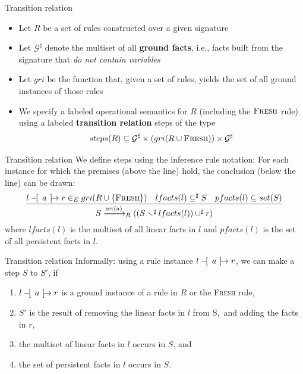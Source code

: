 \documentclass[11pt,aspectratio=169]{beamer}
\begin{document}
\begin{frame}[fragile]{Transition relation}
    \begin{itemize}
        \item Let $R$ be a set of rules constructed over a given signature
        \item Let $\mathcal{G}^{\sharp}$ denote the multiset of all
              \textbf{ground facts}, i.e., facts built from the signature that 
              \textit{do not contain variables}
        \item Let $gri$ be the function that, given a set of rules, yields the 
              set of all ground instances of those rules
        \item We specify a labeled operational semantics for $R$ (including the 
              $\textsc{Fresh}$ rule) using a labeled
              \textbf{transition relation} steps of the type
        \begin{equation*}
            steps(R) \subseteq \mathcal{G}^{\sharp} \times (gri(R \cup {\textsc
            {Fresh}})) \times \mathcal{G}^{\sharp}
        \end{equation*}
    \end{itemize}
\end{frame}

\begin{frame}[fragile]{Transition relation}
    We define steps using the inference rule notation: For each instance for 
    which the premises (above the line) hold, the conclusion (below the line) 
    can be drawn:
    \begin{equation*}
        \dfrac{
            l -\hspace{-4pt}[\hspace{5pt} a \hspace{4pt}]\hspace{-4.6pt}\rightarrow r \in_{E} gri(R \cup\{\textsc{Fresh}\}) \quad
            lfacts(l)\subseteq^{\sharp}S \quad pfacts(l)\subseteq set(S)
        }{S \xrightarrow{\text{set(a)}}_R
        ((S \smallsetminus^{\sharp} lfacts(l))\cup^{\sharp}r)}
        \end{equation*}
        where $lfacts(l)$ is the multiset of all linear facts in $l$ and
        $pfacts(l)$ is the set of all persistent facts in $l$.
\end{frame}

\begin{frame}[fragile]{Transition relation}
    Informally: using a rule instance $l -\hspace{-4pt}[\hspace{5pt} a \hspace{4pt}]\hspace{-4.6pt}\rightarrow r$, we can make a step $S$ 
    to $S'$, if
    \begin{enumerate}
        \item $l -\hspace{-4pt}[\hspace{5pt} a \hspace{4pt}]\hspace{-4.6pt}\rightarrow r$ is a ground instance of a rule 
              in $R$ or the \textsc{Fresh} rule,
        \item $S'$ is the result of removing the linear facts in $l$ from S$,$ 
              and adding the facts in $r$,
        \item the multiset of linear facts in $l$ occurs in $S$, and
        \item the set of persistent facts in $l$ occurs in $S$.
    \end{enumerate}
\end{frame}
\end{document}
